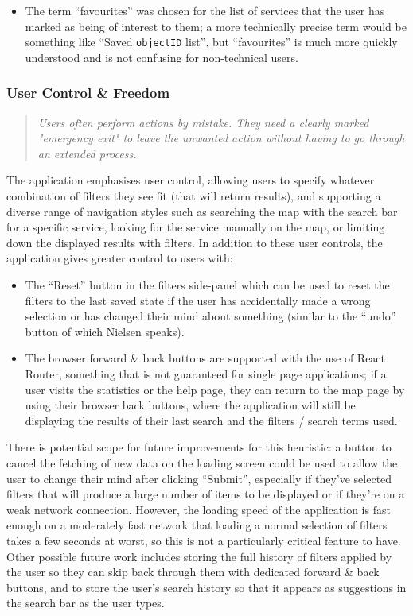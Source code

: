\documentclass[a4paper,11pt]{report}
\begin{document}
\begin{itemize}
    \item   The term ``favourites'' was chosen for the list of services that the user has marked as being of interest to them;
            a more technically precise term would be something like ``Saved \verb|objectID| list'', but ``favourites'' is much more quickly understood and is not confusing for non-technical users.
    \end{itemize}

\subsubsection{User Control \& Freedom}
\begin{quote}
    \textit{Users often perform actions by mistake. They need a clearly marked "emergency exit" to leave the unwanted action without having to go through an extended process.}
\end{quote}

The application emphasises user control, allowing users to specify whatever combination of filters they see fit (that will return results), and supporting a diverse range of navigation styles such as searching the map with the search bar for a specific service, looking for the service manually on the map, or limiting down the displayed results with filters. 
In addition to these user controls, the application gives greater control to users with:
\begin{itemize}
    \item   The ``Reset'' button in the filters side-panel which can be used to reset the filters to the last saved state if the user has accidentally made a wrong selection or has changed their mind about something (similar to the ``undo'' button of which Nielsen speaks).
    \item   The browser forward \& back buttons are supported with the use of React Router, something that is not guaranteed for single page applications;
            if a user visits the statistics or the help page, they can return to the map page by using their browser back buttons, where the application will still be displaying the results of their last search and the filters / search terms used.
\end{itemize}

There is potential scope for future improvements for this heuristic:
a button to cancel the fetching of new data on the loading screen could be used to allow the user to change their mind after clicking ``Submit'', especially if they've selected filters that will produce a large number of items to be displayed or if they're on a weak network connection.
However, the loading speed of the application is fast enough on a moderately fast network that loading a normal selection of filters takes a few seconds at worst, so this is not a particularly critical feature to have.
Other possible future work includes storing the full history of filters applied by the user so they can skip back through them with dedicated forward \& back buttons, and to store the user's search history so that it appears as suggestions in the search bar as the user types.
\end{document}
